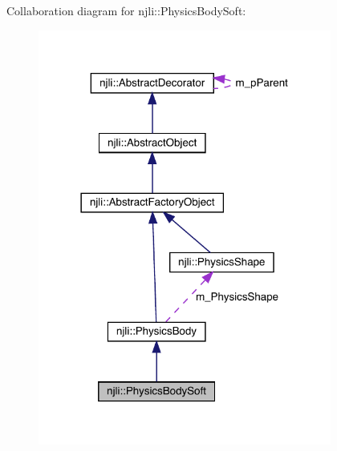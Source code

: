 Collaboration diagram for njli\+:\+:Physics\+Body\+Soft\+:\nopagebreak
\begin{figure}[H]
\begin{center}
\leavevmode
\includegraphics[width=273pt]{classnjli_1_1_physics_body_soft__coll__graph}
\end{center}
\end{figure}
